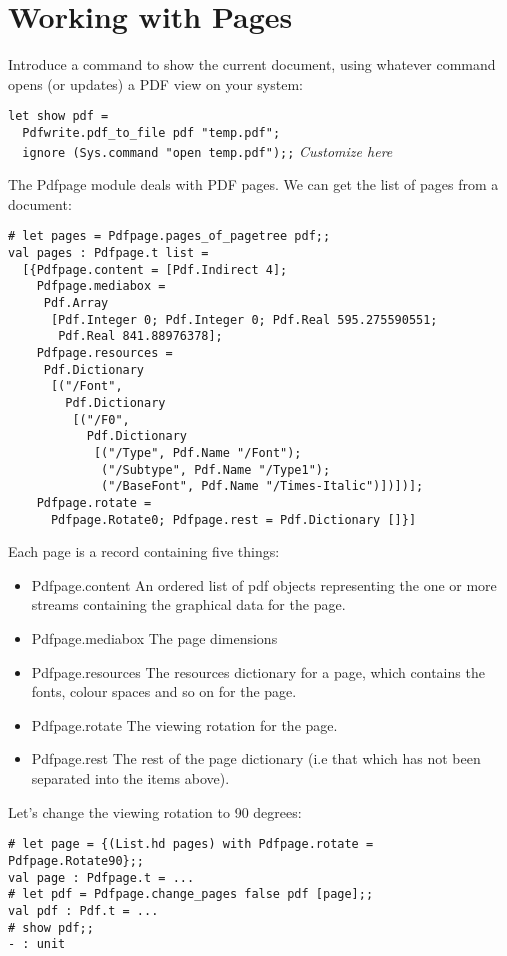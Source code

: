 \documentclass[a4paper]{memoir}
\begin{document}
\section*{Working with Pages}
Introduce a command to show the current document, using whatever command opens (or updates) a PDF view on your system:
\begin{framed}
\noindent\verb!let show pdf =!\\
\verb!  Pdfwrite.pdf_to_file pdf "temp.pdf";!\\
\verb!  ignore (Sys.command "open temp.pdf");;! \textit{Customize here}\\
\end{framed}

\noindent The \textsf{Pdfpage} module deals with PDF pages. We can get the list of pages from a document:
\begin{framed}
\small\begin{verbatim}
# let pages = Pdfpage.pages_of_pagetree pdf;;
val pages : Pdfpage.t list =
  [{Pdfpage.content = [Pdf.Indirect 4];
    Pdfpage.mediabox =
     Pdf.Array
      [Pdf.Integer 0; Pdf.Integer 0; Pdf.Real 595.275590551;
       Pdf.Real 841.88976378];
    Pdfpage.resources =
     Pdf.Dictionary
      [("/Font",
        Pdf.Dictionary
         [("/F0",
           Pdf.Dictionary
            [("/Type", Pdf.Name "/Font");
             ("/Subtype", Pdf.Name "/Type1");
             ("/BaseFont", Pdf.Name "/Times-Italic")])])];
    Pdfpage.rotate =
      Pdfpage.Rotate0; Pdfpage.rest = Pdf.Dictionary []}]
\end{verbatim}
\end{framed}
\noindent Each page is a record containing five things:
\begin{itemize}
\item \textsf{Pdfpage.content} An ordered list of pdf objects representing the one or more streams containing the graphical data for the page.
\item \textsf{Pdfpage.mediabox} The page dimensions
\item \textsf{Pdfpage.resources} The resources dictionary for a page, which contains the fonts, colour spaces and so on for the page.
\item \textsf{Pdfpage.rotate} The viewing rotation for the page.
\item \textsf{Pdfpage.rest} The rest of the page dictionary (i.e that which has not been separated into the items above).
\end{itemize}
Let's change the viewing rotation to 90 degrees:
\begin{framed}
\small\begin{verbatim}
# let page = {(List.hd pages) with Pdfpage.rotate = Pdfpage.Rotate90};;
val page : Pdfpage.t = ...
# let pdf = Pdfpage.change_pages false pdf [page];;
val pdf : Pdf.t = ...
# show pdf;;
- : unit
\end{verbatim}
\end{framed}
\end{document}
